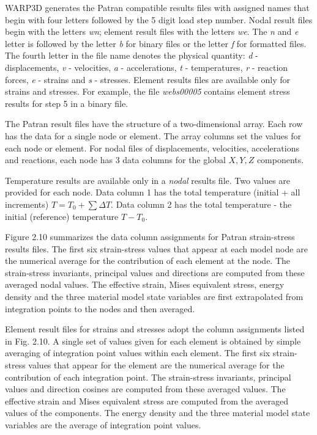 \documentclass[11pt]{report}
\numberwithin{equation}{section}
\newcommand{\ti}{\emph}
\begin{document}
WARP3D generates the Patran compatible results files with assigned names that begin with four
letters followed by the 5 digit load step number. Nodal result files begin with
the letters \ti{wn}; element result files with the letters \ti{we}. The \ti{n} and \ti{e} letter is
followed by the letter \ti{b} for binary files or the letter \ti{f} for formatted files.
The fourth letter in the file name denotes the physical quantity: \ti{d} -
displacements, \ti{v} - velocities, \ti{a} - accelerations, \ti{t} - temperatures,
\ti{r} - reaction forces, \ti{e} - strains and \ti{s} - stresses. Element 
results files are available only
for strains and stresses. For example, the file \ti{webs00005} contains element
stress results for step 5 in a binary file.

The Patran result files have the structure of a two-dimensional array.
Each row has the data for a single node or element. The array columns set the
values for each node  or element.  For nodal files of displacements, velocities,
accelerations and reactions, each node has 3 data columns for the global
$X, Y, Z$ components. 

Temperature results are available only in a \ti{nodal} results file. Two values are
provided for each node. Data column 1 has the total temperature (initial + all increments)
$T= T_0 + \sum \Delta T$.
Data column 2 has the total temperature - the
initial (reference) temperature $T-T_0$.

Figure 2.10 summarizes the data column assignments for Patran strain-stress
results files. The first six strain-stress values that appear at each model node
 are the numerical average for the contribution
of each element at the node. The strain-stress invariants, principal values and
directions are computed from these averaged nodal values. The effective strain,
Mises equivalent stress, energy density and the three material model state
variables are first extrapolated from integration points to the nodes and then
averaged. 

Element result files for strains and stresses adopt the column assignments
listed in Fig. 2.10. A single set of values given for
each element is obtained by simple averaging of integration point values within each
element. The first six strain-stress values that appear for the element are the
numerical average for the contribution of each integration point. The strain-stress
invariants, principal values and direction cosines are computed from these averaged
values. The effective strain and Mises equivalent stress are computed from the
averaged values of the components. The energy density and the three material
model state variables are the average of integration point values.
\end{document}
